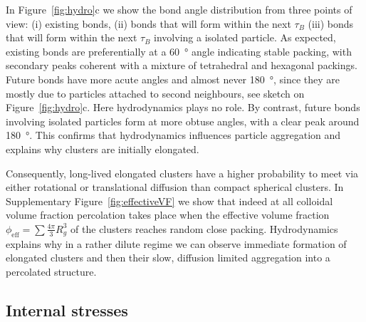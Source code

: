 In Figure~\ref{fig:hydro}c we show the bond angle distribution from three points of view: (i) existing bonds, (ii) bonds that will form within the next $\tau_B$ (iii) bonds that will form within the next $\tau_B$ involving a isolated particle. As expected, existing bonds are preferentially at a \SI{60}{\degree} angle indicating stable packing, with secondary peaks coherent with a mixture of tetrahedral and hexagonal packings. Future bonds have more acute angles and almost never \SI{180}{\degree}, since they are mostly due to particles attached to second neighbours, see sketch on Figure~\ref{fig:hydro}c. Here hydrodynamics plays no role. By contrast, future bonds involving isolated particles form at more obtuse angles, with a clear peak around \SI{180}{\degree}. This confirms that hydrodynamics influences particle aggregation and explains why clusters are initially elongated.

Consequently, long-lived elongated clusters have a higher probability to meet via either rotational or translational diffusion than compact spherical clusters. In Supplementary Figure~\ref{fig:effectiveVF} we show that indeed at all colloidal volume fraction percolation takes place when the effective volume fraction $\phi_\text{eff} = \sum\frac{4\pi}{3}R_g^3$ of the clusters reaches random close packing. Hydrodynamics explains why in a rather dilute regime we can observe immediate formation of elongated clusters and then their slow, diffusion limited aggregation into a percolated structure.

\subsection*{Internal stresses}

